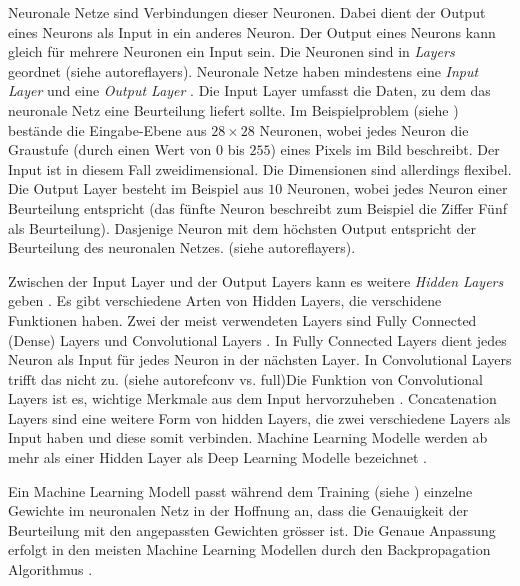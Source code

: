 
Neuronale Netze sind Verbindungen dieser Neuronen. Dabei dient der Output eines
Neurons als Input in ein anderes Neuron. Der Output eines Neurons kann gleich
für mehrere Neuronen ein Input sein. Die Neuronen sind in \emph{Layers} geordnet
(siehe autoref{layers}). Neuronale Netze haben mindestens eine \emph{Input
Layer} und eine \emph{Output Layer}
\cite{nielsen_neural_2015}\cite{ognjanovski_everything_2020}. Die Input Layer
umfasst die Daten, zu dem das neuronale Netz eine Beurteilung liefert sollte. Im
Beispielproblem (siehe ) bestände die Eingabe-Ebene aus
$28\times28$ Neuronen, wobei jedes Neuron die Graustufe (durch einen Wert von
$0$ bis $255$) eines Pixels im Bild beschreibt. Der Input ist in diesem Fall
zweidimensional. Die Dimensionen sind allerdings flexibel. Die Output Layer
besteht im Beispiel aus $10$ Neuronen, wobei jedes Neuron einer Beurteilung
entspricht (das fünfte Neuron beschreibt zum Beispiel die Ziffer Fünf als
Beurteilung). Dasjenige Neuron mit dem höchsten Output entspricht der
Beurteilung des neuronalen Netzes. (siehe autoref{layers}).


Zwischen der Input Layer und der Output Layers kann es weitere \emph{Hidden
Layers} geben \cite{malik_what_2019}. Es gibt verschiedene Arten von Hidden
Layers, die verschidene Funktionen haben. Zwei der meist verwendeten Layers sind
Fully Connected (Dense) Layers und Convolutional Layers
\cite{unzueta_convolutional_2022}. In Fully Connected Layers dient jedes Neuron
als Input für jedes Neuron in der nächsten Layer. In Convolutional Layers trifft
das nicht zu. (siehe autoref{conv vs. full})Die Funktion von Convolutional
Layers ist es, wichtige Merkmale aus dem Input hervorzuheben
\cite{deshpande_beginners_nodate}. Concatenation Layers
\cite{jayawardana_concatenating_2021} sind eine weitere Form von hidden Layers,
die zwei verschiedene Layers als Input haben und diese somit verbinden. Machine
Learning Modelle werden ab mehr als einer Hidden Layer als Deep Learning Modelle
bezeichnet \cite{jan-dirk_kranz_deep_2019}.


Ein Machine Learning Modell passt während dem Training (siehe
) einzelne Gewichte im neuronalen Netz in der Hoffnung
an, dass die Genauigkeit der Beurteilung mit den angepassten Gewichten grösser
ist. Die Genaue Anpassung erfolgt in den meisten Machine Learning Modellen durch
den Backpropagation Algorithmus
\cite{ognjanovski_everything_2020}\cite{david_e_rumelhart_learning_nodate}.

